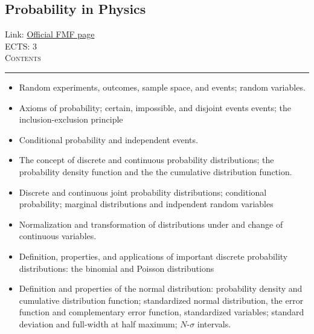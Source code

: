 \documentclass[11pt, a4paper]{article}
\newenvironment{course}[3]{
\subsection{#1}%
Link: \href{#2}{Official FMF page}\\%
ECTS: #3%
\vspace{1ex}
\\
{\large \textsc{Contents}}\\[-0.9ex]%
\rule{\textwidth}{0.5pt}
\vspace{-3ex}
}
{}
\newenvironment{chapter}[1]{
\begin{tcolorbox}[title=#1, breakable]
}
{\end{tcolorbox}}
\begin{document}
\begin{course}{Probability in Physics}{https://www.fmf.uni-lj.si/en/study-physics/programmes/1fiz/2020/7000777/courses/1177/}{3}
    \label{probability-in-physics}

    \begin{chapter}{Fundamentals of frequentist probability}
        \begin{itemize}
        
            \item Random experiments, outcomes, sample space, and events; random variables.

            \item Axioms of probability; certain, impossible, and disjoint events events; the inclusion-exclusion principle

            \item Conditional probability and independent events.
        
        \end{itemize}
    \end{chapter}

    \begin{chapter}{Probability distributions}

        \begin{itemize}
        
            \item The concept of discrete and continuous probability distributions; the probability density function and the the cumulative distribution function.

            \item Discrete and continuous joint probability distributions; conditional probability; marginal distributions and indpendent random variables

            \item Normalization and transformation of distributions under and change of continuous variables.

            \item Definition, properties, and applications of important discrete probability distributions: the binomial and Poisson distributions

            \item Definition and properties of the normal distribution: probability density and cumulative distribution function; standardized normal distribution, the error function and complementary error function, standardized variables; standard deviation and full-width at half maximum; $ N $-$ \sigma $ intervals.


\end{itemize}
\end{chapter}
\end{course}
\end{document}
